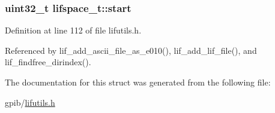 \subsubsection[{\texorpdfstring{start}{start}}]{\setlength{\rightskip}{0pt plus 5cm}uint32\+\_\+t lifspace\+\_\+t\+::start}\hypertarget{structlifspace__t_a35702daf31460f978a09aef7a42c2671}{}\label{structlifspace__t_a35702daf31460f978a09aef7a42c2671}


Definition at line 112 of file lifutils.\+h.



Referenced by lif\+\_\+add\+\_\+ascii\+\_\+file\+\_\+as\+\_\+e010(), lif\+\_\+add\+\_\+lif\+\_\+file(), and lif\+\_\+findfree\+\_\+dirindex().



The documentation for this struct was generated from the following file\+:\begin{DoxyCompactItemize}
\item 
gpib/\hyperlink{lifutils_8h}{lifutils.\+h}\end{DoxyCompactItemize}
